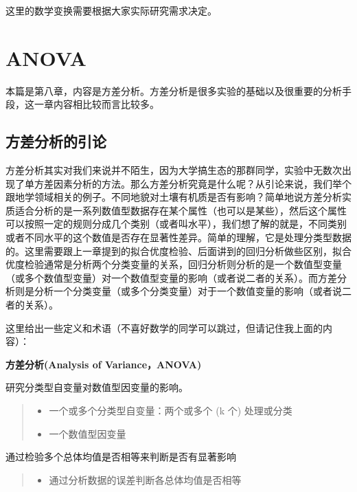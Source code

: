 \documentclass[]{ctexbook}
\providecommand{\tightlist}{%
  \setlength{\itemsep}{0pt}\setlength{\parskip}{0pt}}
\begin{document}
这里的数学变换需要根据大家实际研究需求决定。

\hypertarget{ANOVA}{%
\chapter{ANOVA}\label{ANOVA}}

本篇是第八章，内容是方差分析。方差分析是很多实验的基础以及很重要的分析手段，这一章内容相比较而言比较多。

\hypertarget{ux65b9ux5deeux5206ux6790ux7684ux5f15ux8bba}{%
\section{方差分析的引论}\label{ux65b9ux5deeux5206ux6790ux7684ux5f15ux8bba}}

方差分析其实对我们来说并不陌生，因为大学搞生态的那群同学，实验中无数次出现了单方差因素分析的方法。那么方差分析究竟是什么呢？从引论来说，我们举个跟地学领域相关的例子。不同地貌对土壤有机质是否有影响？简单地说方差分析实质适合分析的是一系列数值型数据存在某个属性（也可以是某些），然后这个属性可以按照一定的规则分成几个类别（或者叫水平），我们想了解的就是，不同类别或者不同水平的这个数值是否存在显著性差异。简单的理解，它是处理分类型数据的。这里需要跟上一章提到的拟合优度检验、后面讲到的回归分析做些区别，拟合优度检验通常是分析两个分类变量的关系，回归分析则分析的是一个数值型变量（或多个数值型变量）对一个数值型变量的影响（或者说二者的关系）。而方差分析则是分析一个分类变量（或多个分类变量）对于一个数值变量的影响（或者说二者的关系）。

这里给出一些定义和术语（不喜好数学的同学可以跳过，但请记住我上面的内容）：

\textbf{方差分析(Analysis of Variance，ANOVA)}

研究分类型自变量对数值型因变量的影响。

\begin{quote}
\begin{itemize}
\tightlist
\item
  一个或多个分类型自变量：两个或多个 (k 个) 处理或分类
\item
  一个数值型因变量
\end{itemize}
\end{quote}

通过检验多个总体均值是否相等来判断是否有显著影响

\begin{quote}
\begin{itemize}
\tightlist
\item
  通过分析数据的误差判断各总体均值是否相等
\end{itemize}
\end{quote}
\end{document}
